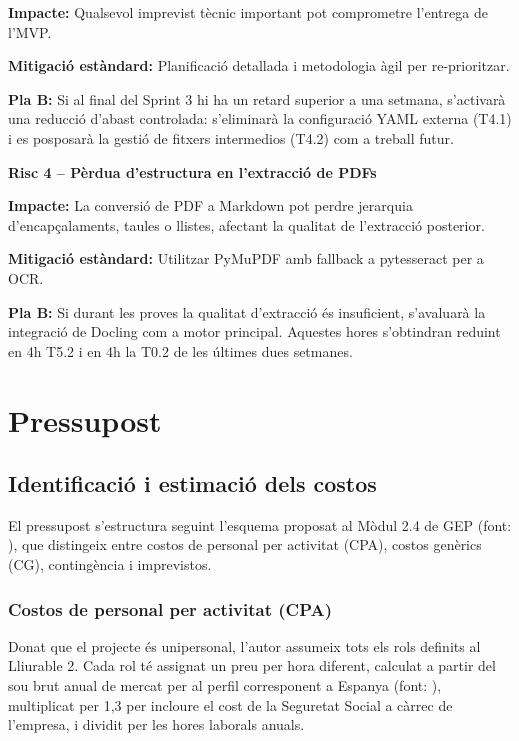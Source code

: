 \documentclass[12pt,a4paper,twoside]{report}
\begin{document}
\textbf{Impacte:} Qualsevol imprevist t\`ecnic important pot comprometre l'entrega de l'MVP.

\textbf{Mitigaci\'o est\`andard:} Planificaci\'o detallada i metodologia \`agil per re-prioritzar.

\textbf{Pla B:} Si al final del Sprint 3 hi ha un retard superior a una setmana, s'activar\`a una reducci\'o d'abast controlada: s'eliminar\`a la configuraci\'o YAML externa (T4.1) i es posposar\`a la gesti\'o de fitxers intermedios (T4.2) com a treball futur.

\vspace{0.5cm}

\textbf{Risc 4 -- P\`erdua d'estructura en l'extracci\'o de PDFs}

\textbf{Impacte:} La conversi\'o de PDF a Markdown pot perdre jerarquia d'encap\c{c}alaments, taules o llistes, afectant la qualitat de l'extracci\'o posterior.

\textbf{Mitigaci\'o est\`andard:} Utilitzar PyMuPDF amb fallback a pytesseract per a OCR.

\textbf{Pla B:} Si durant les proves la qualitat d'extracci\'o \'es insuficient, s'avaluar\`a la integraci\'o de Docling com a motor principal. Aquestes hores s'obtindran reduint en 4h T5.2 i en 4h la T0.2 de les \'ultimes dues setmanes.

\chapter{Pressupost}
\label{chap:pressupost}

\section{Identificaci\'o i estimaci\'o dels costos}
\label{sec:costos}

El pressupost s'estructura seguint l'esquema proposat al M\`odul 2.4 de GEP (font: \cite{gep24}), que distingeix entre costos de personal per activitat (CPA), costos gen\`erics (CG), conting\`encia i imprevistos.

\subsection{Costos de personal per activitat (CPA)}
\label{subsec:cpa}

Donat que el projecte \'es unipersonal, l'autor assumeix tots els rols definits al Lliurable 2. Cada rol t\'e assignat un preu per hora diferent, calculat a partir del sou brut anual de mercat per al perfil corresponent a Espanya (font: \cite{infojobs}), multiplicat per 1,3 per incloure el cost de la Seguretat Social a c\`arrec de l'empresa, i dividit per les hores laborals anuals.
\end{document}
